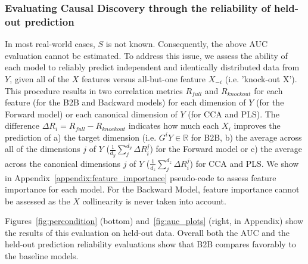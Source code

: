 \subsubsection{Evaluating Causal Discovery through the reliability of held-out prediction}

In most real-world cases, $S$ is not known. Consequently, the above AUC
evaluation cannot be estimated.
To address this issue, we assess the ability of each model to reliably predict
independent and identically distributed data from $Y$, given all of the $X$
features versus all-but-one feature $X_{-i}$ (i.e. 'knock-out X'). This
procedure results in two correlation metrics $R_{full}$ and $R_{knockout}$ for
each feature (for the B2B and Backward models) for each dimension of $Y$ (for
the Forward model) or each canonical dimension of $Y$ (for CCA and PLS). The
difference $\Delta R_i = R_{full}-R_{knockout}$ indicates how much each
$X_i$ improves the prediction of
a) the target dimension (i.e. $G^iY \in \mathbb{R}$ for B2B,
b) the average across all of the dimensions $j$ of $Y$
($\frac{1}{d_y}\sum_{j}^{d_y}\Delta R_i^{j}$) for the
Forward model or
c) the average across the canonical dimensions $j$ of $Y$
($\frac{1}{d_z}\sum_{j}^{d_z}\Delta R_i^{j}$) for CCA and PLS.
We show in Appendix~\ref{appendix:feature_importance} pseudo-code to assess
feature importance for each model. For the Backward Model, feature importance
cannot be assessed as the $X$ collinearity is never
taken into account.

Figures~\ref{fig:percondition} (bottom) and~\ref{fig:auc_plots} (right, in
Appendix) show the results of this evaluation on held-out data.
Overall both the AUC and the held-out prediction reliability evaluations
show that B2B compares favorably to the baseline models.
